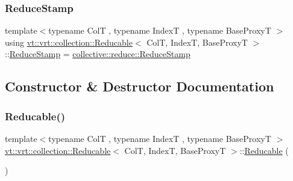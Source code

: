 \mbox{\label{structvt_1_1vrt_1_1collection_1_1_reducable_a19f80baf23f36dad4948ef07322fd0cb}} 
\subsubsection{\texorpdfstring{Reduce\+Stamp}{ReduceStamp}}
{\footnotesize\ttfamily template$<$typename ColT , typename IndexT , typename Base\+ProxyT $>$ \\
using \hyperlink{structvt_1_1vrt_1_1collection_1_1_reducable}{vt\+::vrt\+::collection\+::\+Reducable}$<$ ColT, IndexT, Base\+ProxyT $>$\+::\hyperlink{structvt_1_1vrt_1_1collection_1_1_reducable_a19f80baf23f36dad4948ef07322fd0cb}{Reduce\+Stamp} =  \hyperlink{namespacevt_1_1collective_1_1reduce_a7b7cb3021ac5654d92825d9fab0250b2}{collective\+::reduce\+::\+Reduce\+Stamp}}



\subsection{Constructor \& Destructor Documentation}
\mbox{\label{structvt_1_1vrt_1_1collection_1_1_reducable_a807b462380873448bfcf4661b4b28a2d}} 
\subsubsection{\texorpdfstring{Reducable()}{Reducable()}\hspace{0.1cm}{\footnotesize\ttfamily [1/4]}}
{\footnotesize\ttfamily template$<$typename ColT , typename IndexT , typename Base\+ProxyT $>$ \\
\hyperlink{structvt_1_1vrt_1_1collection_1_1_reducable}{vt\+::vrt\+::collection\+::\+Reducable}$<$ ColT, IndexT, Base\+ProxyT $>$\+::\hyperlink{structvt_1_1vrt_1_1collection_1_1_reducable}{Reducable} (\begin{DoxyParamCaption}{ }\end{DoxyParamCaption})\hspace{0.3cm}{\ttfamily [default]}}

